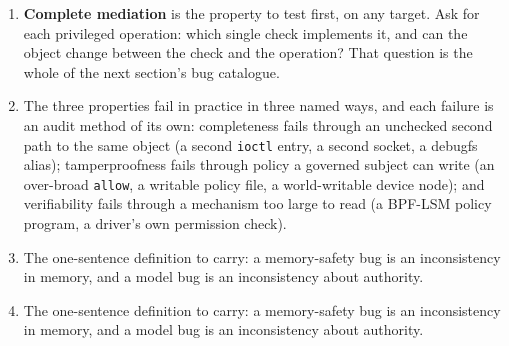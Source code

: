 \documentclass[12pt]{Training}
\begin{document}
\begin{enumerate}
    \item \textbf{Complete mediation} is the property to test first, on any target. Ask for each privileged operation: which single check implements it, and can the object change between the check and the operation? That question is the whole of the next section's bug catalogue.
    \item The three properties fail in practice in three named ways, and each failure is an audit method of its own: completeness fails through an unchecked second path to the same object (a second \lstinline{ioctl} entry, a second socket, a debugfs alias); tamperproofness fails through policy a governed subject can write (an over-broad \lstinline{allow}, a writable policy file, a world-writable device node); and verifiability fails through a mechanism too large to read (a BPF-LSM policy program, a driver's own permission check).
    \item The one-sentence definition to carry: a memory-safety bug is an inconsistency in memory, and a model bug is an inconsistency about authority.
    \item The one-sentence definition to carry: a memory-safety bug is an inconsistency in memory, and a model bug is an inconsistency about authority.
\end{enumerate}
\end{document}
